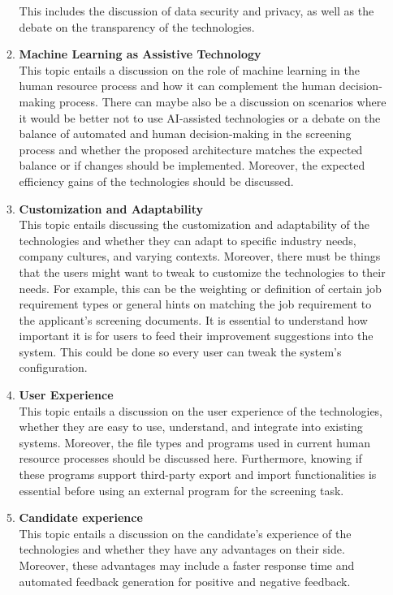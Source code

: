 \documentclass[draft,final]{thesisclass} %
\begin{document}
\begin{enumerate}
\begin{enumerate}
        This includes the discussion of data security and privacy, as well as the debate on the transparency of the technologies.
        \item \textbf{Machine Learning as Assistive Technology}\\
        This topic entails a discussion on the role of machine learning in the human resource process and how it can complement the human decision-making process.
        There can maybe also be a discussion on scenarios where it would be better not to use \acs{AI}-assisted technologies or a debate on the balance of automated and human decision-making in the screening process and whether the proposed architecture matches the expected balance or if changes should be implemented.
        Moreover, the expected efficiency gains of the technologies should be discussed.
        \item \textbf{Customization and Adaptability}\\
        This topic entails discussing the customization and adaptability of the technologies and whether they can adapt to specific industry needs, company cultures, and varying contexts.
        Moreover, there must be things that the users might want to tweak to customize the technologies to their needs.
        For example, this can be the weighting or definition of certain job requirement types or general hints on matching the job requirement to the applicant's screening documents.
        It is essential to understand how important it is for users to feed their improvement suggestions into the system.
        This could be done so every user can tweak the system's configuration.
        \item \textbf{User Experience}\\
        This topic entails a discussion on the user experience of the technologies, whether they are easy to use, understand, and integrate into existing systems.
        Moreover, the file types and programs used in current human resource processes should be discussed here.
        Furthermore, knowing if these programs support third-party export and import functionalities is essential before using an external program for the screening task.
        \item \textbf{Candidate experience}\\
        This topic entails a discussion on the candidate's experience of the technologies and whether they have any advantages on their side.
        Moreover, these advantages may include a faster response time and automated feedback generation for positive and negative feedback.

\end{enumerate}
\end{enumerate}
\end{document}
